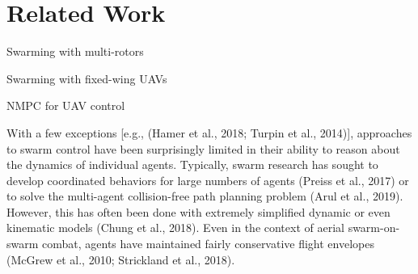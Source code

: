 \section{Related Work}
Swarming with multi-rotors

Swarming with fixed-wing UAVs

NMPC for UAV control

With a few exceptions [e.g., (Hamer et al., 2018; Turpin et al., 2014)], approaches to swarm control
have been surprisingly limited in their ability to reason about the dynamics of individual agents.
Typically, swarm research has sought to develop coordinated behaviors for large numbers of agents
(Preiss et al., 2017) or to solve the multi-agent collision-free path planning problem (Arul et al.,
2019). However, this has often been done with extremely simplified dynamic or even kinematic
models (Chung et al., 2018). Even in the context of aerial swarm-on-swarm combat, agents have
maintained fairly conservative flight envelopes (McGrew et al., 2010; Strickland et al., 2018).